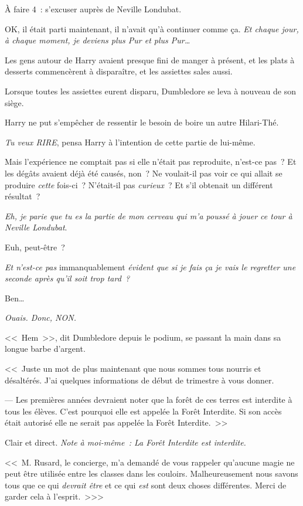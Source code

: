 À faire 4~: s'excuser auprès de Neville Londubat.

OK, il était parti maintenant, il n'avait qu'à continuer comme ça. \emph{Et chaque jour, à chaque moment, je deviens plus Pur et plus Pur…}

Les gens autour de Harry avaient presque fini de manger à présent, et les plats à desserts commencèrent à disparaître, et les assiettes sales aussi.

Lorsque toutes les assiettes eurent disparu, Dumbledore se leva à nouveau de son siège.

Harry ne put s'empêcher de ressentir le besoin de boire un autre Hilari-Thé.

\emph{Tu veux RIRE}, pensa Harry à l'intention de cette partie de lui-même.

Mais l'expérience ne comptait pas si elle n'était pas reproduite, n'est-ce pas~? Et les dégâts avaient déjà été causés, non~? Ne voulait-il pas voir ce qui allait se produire \emph{cette} fois-ci~? N'était-il pas \emph{curieux}~? Et s'il obtenait un différent résultat~?

\emph{Eh, je parie que tu es la partie de mon cerveau qui m'a poussé à jouer ce tour à Neville Londubat}.

Euh, peut-être~?

\emph{Et n'est-ce pas} immanquablement \emph{évident que si je fais ça je vais le regretter une seconde après qu'il soit trop tard~?}

Ben…

\emph{Ouais. Donc, NON.}

<<~Hem~>>, dit Dumbledore depuis le podium, se passant la main dans sa longue barbe d'argent.

<<~Juste un mot de plus maintenant que nous sommes tous nourris et désaltérés. J'ai quelques informations de début de trimestre à vous donner.

--- Les premières années devraient noter que la forêt de ces terres est interdite à tous les élèves. C'est pourquoi elle est appelée la Forêt Interdite. Si son accès était autorisé elle ne serait pas appelée la Forêt Interdite.~>>

Clair et direct. \emph{Note à moi-même~: La Forêt Interdite est interdite.}

<<~M. Rusard, le concierge, m'a demandé de vous rappeler qu'aucune magie ne peut être utilisée entre les classes dans les couloirs. Malheureusement nous savons tous que ce qui \emph{devrait être} et ce qui \emph{est} sont deux choses différentes. Merci de garder cela à l'esprit.~>>>

